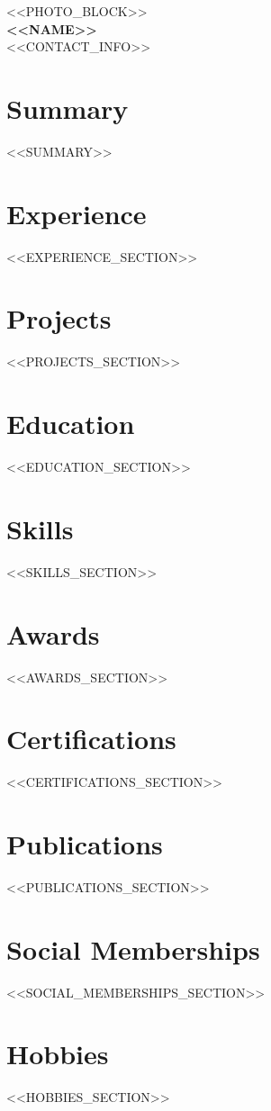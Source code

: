 \documentclass[<<FONT_SIZE>>,a4paper]{article}
\begin{document}
\begin{center}
    <<PHOTO_BLOCK>> \\
    \vspace{2mm}
    {\Huge \textbf{\color{accent}<<NAME>>}} \\
    \vspace{1.5mm}
    {\small \textcolor{primary}{<<CONTACT_INFO>>}}
\end{center}

\vspace{5mm}

\section*{Summary}
<<SUMMARY>>

\section*{Experience}
<<EXPERIENCE_SECTION>>

\section*{Projects}
<<PROJECTS_SECTION>>

\section*{Education}
<<EDUCATION_SECTION>>

\section*{Skills}
<<SKILLS_SECTION>>

\section*{Awards}
<<AWARDS_SECTION>>

\section*{Certifications}
<<CERTIFICATIONS_SECTION>>

\section*{Publications}
<<PUBLICATIONS_SECTION>>

\section*{Social Memberships}
<<SOCIAL_MEMBERSHIPS_SECTION>>

\section*{Hobbies}
<<HOBBIES_SECTION>>
\end{document}
